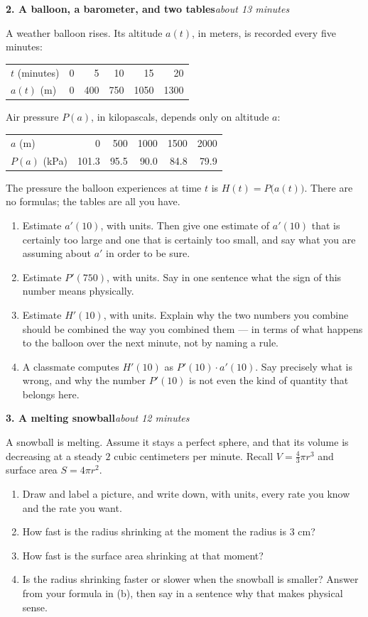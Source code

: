 \documentclass[11pt]{article}
\newcommand{\prob}[2]{\medskip\noindent\textbf{\large #1}\hfill\textit{#2}\par\smallskip}
\begin{document}
\prob{2. A balloon, a barometer, and two tables}{about 13 minutes}
A weather balloon rises. Its altitude $a(t)$, in meters, is recorded every five minutes:
\smallskip
\begin{center}
\begin{tabular}{@{}lrrrrr@{}}
\toprule
$t$ (minutes) & 0 & 5 & 10 & 15 & 20\\
$a(t)$ (m) & 0 & 400 & 750 & 1050 & 1300\\
\bottomrule
\end{tabular}
\end{center}
\smallskip
Air pressure $P(a)$, in kilopascals, depends only on altitude $a$:
\smallskip
\begin{center}
\begin{tabular}{@{}lrrrrr@{}}
\toprule
$a$ (m) & 0 & 500 & 1000 & 1500 & 2000\\
$P(a)$ (kPa) & 101.3 & 95.5 & 90.0 & 84.8 & 79.9\\
\bottomrule
\end{tabular}
\end{center}
\smallskip
The pressure the balloon experiences at time $t$ is $H(t)=P\big(a(t)\big)$. There are no
formulas; the tables are all you have.
\begin{enumerate}
\item Estimate $a'(10)$, with units. Then give one estimate of $a'(10)$ that is certainly
too large and one that is certainly too small, and say what you are assuming about $a'$
in order to be sure.
\item Estimate $P'(750)$, with units. Say in one sentence what the sign of this number
means physically.
\item Estimate $H'(10)$, with units. Explain why the two numbers you combine should be
combined the way you combined them --- in terms of what happens to the balloon over the
next minute, not by naming a rule.
\item A classmate computes $H'(10)$ as $P'(10)\cdot a'(10)$. Say precisely what is wrong,
and why the number $P'(10)$ is not even the kind of quantity that belongs here.
\end{enumerate}

\prob{3. A melting snowball}{about 12 minutes}
A snowball is melting. Assume it stays a perfect sphere, and that its volume is
decreasing at a steady $2$ cubic centimeters per minute. Recall $V=\frac43\pi r^3$ and
surface area $S=4\pi r^2$.
\begin{enumerate}
\item Draw and label a picture, and write down, with units, every rate you know and the
rate you want.
\item How fast is the radius shrinking at the moment the radius is $3$ cm?
\item How fast is the surface area shrinking at that moment?
\item Is the radius shrinking faster or slower when the snowball is smaller? Answer from
your formula in (b), then say in a sentence why that makes physical sense.
\end{enumerate}
\end{document}
